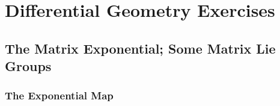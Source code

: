 \chapter{Differential Geometry Exercises}
\section{The Matrix Exponential; Some Matrix Lie Groups}
\subsection{The Exponential Map}


